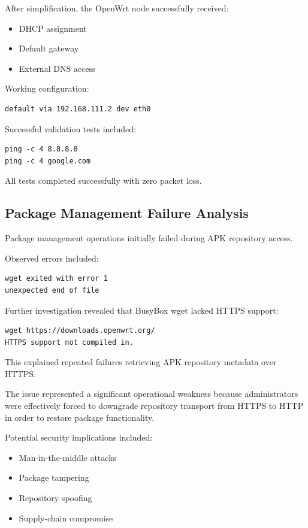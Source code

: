 \documentclass[conference]{IEEEtran}
\begin{document}
After simplification, the OpenWrt node successfully received:

\begin{itemize}
    \item DHCP assignment
    \item Default gateway
    \item External DNS access
\end{itemize}

Working configuration:

\begin{verbatim}
default via 192.168.111.2 dev eth0
\end{verbatim}

Successful validation tests included:

\begin{verbatim}
ping -c 4 8.8.8.8
ping -c 4 google.com
\end{verbatim}

All tests completed successfully with zero packet loss.

\subsection{Package Management Failure Analysis}

Package management operations initially failed during APK repository access.

Observed errors included:

\begin{verbatim}
wget exited with error 1
unexpected end of file
\end{verbatim}

Further investigation revealed that BusyBox wget lacked HTTPS support:

\begin{verbatim}
wget https://downloads.openwrt.org/
HTTPS support not compiled in.
\end{verbatim}

This explained repeated failures retrieving APK repository metadata over HTTPS.

The issue represented a significant operational weakness because administrators were effectively forced to downgrade repository transport from HTTPS to HTTP in order to restore package functionality.

Potential security implications included:

\begin{itemize}
    \item Man-in-the-middle attacks
    \item Package tampering
    \item Repository spoofing
    \item Supply-chain compromise
\end{itemize}
\end{document}
